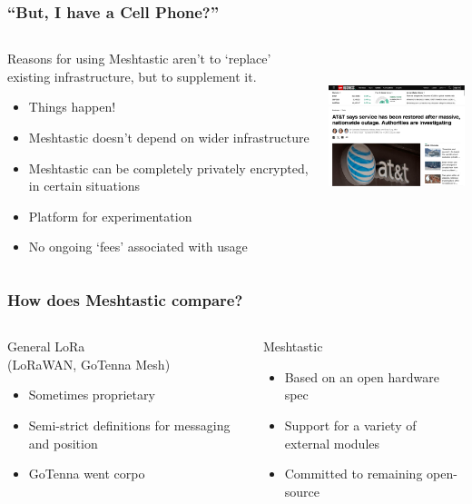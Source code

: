 \documentclass[aspectratio=169]{beamer}
\begin{document}
\begin{frame}[fragile]
  \frametitle{``But, I have a Cell Phone?''}
  \begin{columns}[]
    \begin{column}[T]{0.45\paperwidth}
      Reasons for using Meshtastic aren't to `replace' existing infrastructure, but to supplement it.
      \begin{itemize}%
        \item{Things happen!}
        \item{Meshtastic doesn't depend on wider infrastructure}
        \item{Meshtastic can be completely privately encrypted, in certain situations}
        \item{Platform for experimentation}
        \item{No ongoing `fees' associated with usage}
     \end{itemize}
    \end{column}
    \begin{column}[T]{0.45\paperwidth}
      \includegraphics[height=5cm,keepaspectratio]{images/att.png}
    \end{column}
  \end{columns}
\end{frame}

\begin{frame}[fragile]
  \frametitle{How does Meshtastic compare?}
  \begin{columns}[]
    \begin{column}[T]{0.45\paperwidth}
      \Large{General LoRa\\ (LoRaWAN, GoTenna Mesh)}
      \begin{itemize}
        \item{Sometimes proprietary}
        \item{Semi-strict definitions for messaging and position}
        \item{GoTenna went corpo}
      \end{itemize}
    \end{column}
    \begin{column}[T]{0.45\paperwidth}
      \Large{Meshtastic}
      \begin{itemize}
        \item{Based on an open hardware spec}
        \item{Support for a variety of external modules}
        \item{Committed to remaining open-source}
      \end{itemize}
    \end{column}
  \end{columns}
\end{frame}
\end{document}
